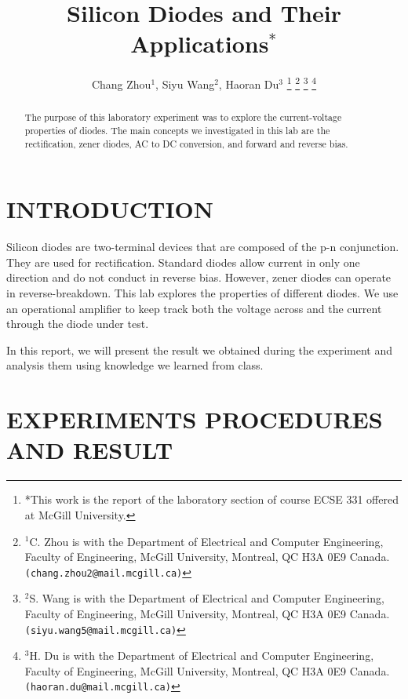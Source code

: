 \documentclass[letterpaper, 10 pt, conference]{ieeeconf}  %
\title{\LARGE \bf Silicon Diodes and Their Applications$^{*}$}
\author{Chang Zhou$^{1}$, Siyu Wang$^{2}$, Haoran Du$^{3}$%
\thanks{*This work is the report of the laboratory section of course ECSE 331 offered at McGill University.}%
\thanks{$^{1}$C. Zhou is with the Department of Electrical and Computer
Engineering, Faculty of Engineering, McGill University, Montreal, QC H3A 0E9 Canada.
{\tt\small (chang.zhou2@mail.mcgill.ca)}}%
\thanks{$^{2}$S. Wang is with the Department of Electrical and Computer
Engineering, Faculty of Engineering, McGill University, Montreal, QC H3A 0E9 Canada.
{\tt\small (siyu.wang5@mail.mcgill.ca)}}%
\thanks{$^{3}$H. Du is with the Department of Electrical and Computer
Engineering, Faculty of Engineering, McGill University, Montreal, QC H3A 0E9 Canada.
{\tt\small (haoran.du@mail.mcgill.ca)}}%
}
\begin{document}
\maketitle
\thispagestyle{empty}
\pagestyle{empty}


\begin{abstract}
  The purpose of this laboratory experiment was to explore the current-voltage properties of diodes. The main concepts we investigated in this lab are the rectification, zener diodes, AC to DC conversion, and forward and reverse bias.
\end{abstract}


\section{INTRODUCTION}
Silicon diodes are two-terminal devices that are composed of the p-n conjunction. They are used for rectification. Standard diodes allow current in only one direction and do not conduct in reverse bias. However, zener diodes can operate in reverse-breakdown. This lab explores the properties of different diodes. We use an operational amplifier to keep track both the voltage across and the current through the diode under test.
\par In this report, we will present the result we obtained during the experiment and analysis them using knowledge we learned from class.
\section{EXPERIMENTS PROCEDURES AND RESULT}
\end{document}
